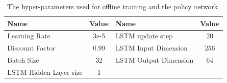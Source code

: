 \begin{table}[ht]
    \centering
    \caption{The hyper-parameters used for offline training and the policy network.}
    \begin{tabular}{l|c|l|c}
    \hline\hline
    Name  & Value &Name  & Value \\ \hline
    Learning Rate    & 3e-5&LSTM update step & 20  \\ \hline
    Discount Factor  & 0.99 &LSTM Input Dimension & 256 \\ \hline
    Batch Size     & 32 &LSTM Output Dimension & 64 \\ \hline
    LSTM Hidden Layer size  & 1 &&\\ \hline
    \end{tabular}
    \label{tab:HyperParam_offline}
\end{table}


